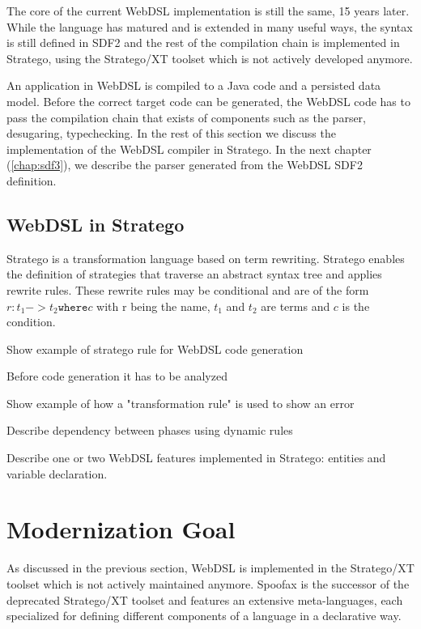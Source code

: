     The core of the current WebDSL implementation is still the same, 15 years later. While the language has matured and is extended in many useful ways, the syntax is still defined in SDF2 and the rest of the compilation chain is implemented in Stratego, using the Stratego/XT toolset which is not actively developed anymore.
    
    An application in WebDSL is compiled to a Java code and a persisted data model. Before the correct target code can be generated, the WebDSL code has to pass the compilation chain that exists of components such as the parser, desugaring, typechecking. In the rest of this section we discuss the implementation of the WebDSL compiler in Stratego. In the next chapter (\cref{chap:sdf3}), we describe the parser generated from the WebDSL SDF2 definition.

    \subsection{WebDSL in Stratego}

      Stratego \autocite{BravenboerDOV06,VisserBT98} is a transformation language based on term rewriting. Stratego enables the definition of strategies that traverse an abstract syntax tree and applies rewrite rules. These rewrite rules may be conditional and are of the form $r : t_1 -> t_2 \texttt{where} c$ with r being the name, $t_1$ and $t_2$ are terms and $c$ is the condition.

      Show example of stratego rule for WebDSL code generation

      Before code generation it has to be analyzed

      Show example of how a "transformation rule" is used to show an error

      Describe dependency between phases using dynamic rules

      Describe one or two WebDSL features implemented in Stratego: entities and variable declaration.

  \section{\label{sec:modernization}Modernization Goal}

    As discussed in the previous section, WebDSL is implemented in the Stratego/XT toolset which is not actively maintained anymore. Spoofax is the successor of the deprecated Stratego/XT toolset and features an extensive meta-languages, each specialized for defining different components of a language in a declarative way.


